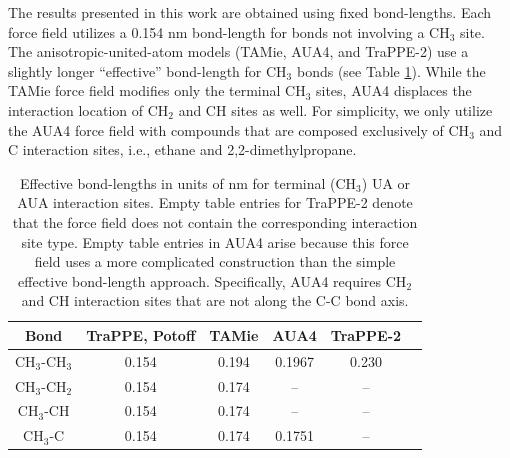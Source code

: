 \documentclass[preprint,review,12pt]{elsarticle}
\begin{document}
    
    
    The results presented in this work are obtained using fixed bond-lengths. Each force field utilizes a 0.154 nm bond-length for bonds not involving a CH$_3$ site. The anisotropic-united-atom models (TAMie, AUA4, and TraPPE-2) use a slightly longer ``effective'' bond-length for CH$_3$ bonds (see Table \ref{tab:bond-lengths}). While the TAMie force field modifies only the terminal CH$_3$ sites, AUA4 displaces the interaction location of CH$_2$ and CH sites as well. For simplicity, we only utilize the AUA4 force field with compounds that are composed exclusively of CH$_3$ and C interaction sites, i.e., ethane and 2,2-dimethylpropane.
    
    \begin{table}[h!]
    	\caption{Effective bond-lengths in units of nm for terminal (CH$_3$) UA or AUA interaction sites. Empty table entries for TraPPE-2 denote that the force field does not contain the corresponding interaction site type. Empty table entries in AUA4 arise because this force field uses a more complicated construction than the simple effective bond-length approach. Specifically, AUA4 requires CH$_2$ and CH interaction sites that are not along the C-C bond axis.} \label{tab:bond-lengths}
    	\begin{center}
    		\begin{tabular}{|c|c|c|c|c|c|}
    			\hline
    			Bond & TraPPE, Potoff & TAMie & AUA4 & TraPPE-2 \\ \hline
    			CH$_3$-CH$_3$ & 0.154 & 0.194 & 0.1967 & 0.230 \\ 
    			CH$_3$-CH$_2$ & 0.154 & 0.174 & -- & -- \\ 
    			CH$_3$-CH & 0.154 & 0.174 & -- & -- \\
    			CH$_3$-C & 0.154 & 0.174 & 0.1751 & -- \\
    			\hline
    		\end{tabular}
    	\end{center} 
    \end{table}
    
\end{document}
